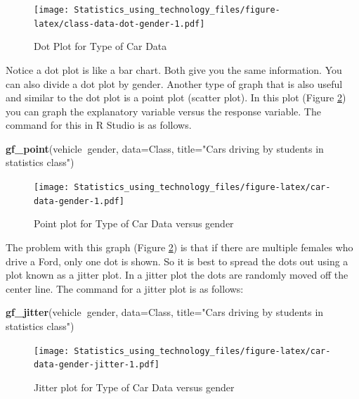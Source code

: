 \documentclass[
]{book}
\newenvironment{Shaded}{\begin{snugshade}}{\end{snugshade}}
\newcommand{\DataTypeTok}[1]{\textcolor[rgb]{0.13,0.29,0.53}{#1}}
\newcommand{\KeywordTok}[1]{\textcolor[rgb]{0.13,0.29,0.53}{\textbf{#1}}}
\newcommand{\NormalTok}[1]{#1}
\newcommand{\OperatorTok}[1]{\textcolor[rgb]{0.81,0.36,0.00}{\textbf{#1}}}
\newcommand{\StringTok}[1]{\textcolor[rgb]{0.31,0.60,0.02}{#1}}
\begin{document}
\begin{figure}
\centering
\texttt{[image: Statistics\_using\_technology\_files/figure-latex/class-data-dot-gender-1.pdf]}
\caption{\label{fig:class-data-dot-gender}Dot Plot for Type of Car Data}
\end{figure}

Notice a dot plot is like a bar chart. Both give you the same information. You can also divide a dot plot by gender. Another type of graph that is also useful and similar to the dot plot is a point plot (scatter plot). In this plot (Figure \ref{fig:car-data-gender}) you can graph the explanatory variable versus the response variable. The command for this in R Studio is as follows.



\begin{Shaded}
\begin{Highlighting}[]
\KeywordTok{gf_point}\NormalTok{(vehicle}\OperatorTok{~}\NormalTok{gender, }\DataTypeTok{data=}\NormalTok{Class, }
         \DataTypeTok{title=}\StringTok{"Cars driving by students in statistics class"}\NormalTok{)}
\end{Highlighting}
\end{Shaded}

\begin{figure}
\centering
\texttt{[image: Statistics\_using\_technology\_files/figure-latex/car-data-gender-1.pdf]}
\caption{\label{fig:car-data-gender}Point plot for Type of Car Data versus gender}
\end{figure}

The problem with this graph (Figure \ref{fig:car-data-gender}) is that if there are multiple females who drive a Ford, only one dot is shown. So it is best to spread the dots out using a plot known as a jitter plot. In a jitter plot the dots are randomly moved off the center line. The command for a jitter plot is as follows:



\begin{Shaded}
\begin{Highlighting}[]
\KeywordTok{gf_jitter}\NormalTok{(vehicle}\OperatorTok{~}\NormalTok{gender, }\DataTypeTok{data=}\NormalTok{Class, }\DataTypeTok{title=}\StringTok{"Cars driving by students }
\StringTok{          in statistics class"}\NormalTok{)}
\end{Highlighting}
\end{Shaded}

\begin{figure}
\centering
\texttt{[image: Statistics\_using\_technology\_files/figure-latex/car-data-gender-jitter-1.pdf]}
\caption{\label{fig:car-data-gender-jitter}Jitter plot for Type of Car Data versus gender}
\end{figure}
\end{document}
